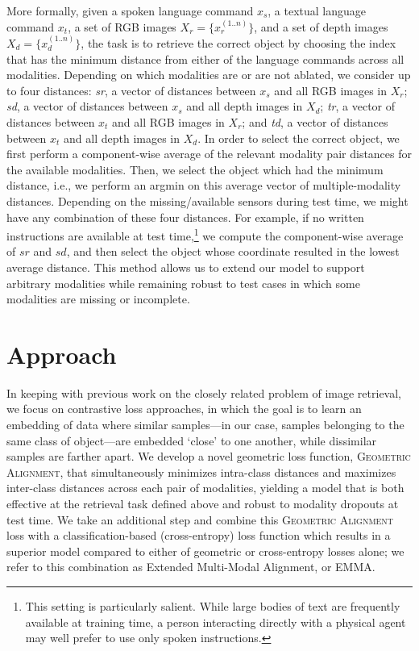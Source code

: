 \documentclass[10pt]{article} %
\newcommand{\ours}{\textsc{EMMA}}
\newcommand{\geom}{\textsc{Geometric Alignment}}
\begin{document}
More formally, given a spoken language command $x_s$, a textual language command $x_t$, a set of RGB images $X_r = \{x_r^{(1..n)}\}$, and a set of depth images $X_d = \{x_d^{(1..n)}\}$, the task is to retrieve the correct object by choosing the index that has the minimum distance from either of the language commands across all modalities.
Depending on which modalities are or are not ablated, we consider up to four distances: \textit{sr}, a vector of distances between $x_s$ and all RGB images in $X_r$; \textit{sd}, a vector of distances between $x_s$ and all depth images in $X_d$; \textit{tr}, a vector of distances between $x_t$ and all RGB images in $X_r$; and \textit{td}, a vector of distances between $x_t$ and all depth images in $X_d$. In order to select the correct object, we first perform a component-wise average of the relevant modality pair distances for the available modalities. Then, we select the object which had the minimum distance, i.e., we perform an argmin on this average vector of multiple-modality distances. Depending on the missing/available sensors during test time, we might have any combination of these four distances. For example, if no written instructions are available at test time,\footnote{This setting is particularly salient. While large bodies of text are frequently available at training time, a person interacting directly with a physical agent may well prefer to use only spoken instructions.} we compute the component-wise average of $sr$ and $sd$, and then select the object whose coordinate resulted in the lowest average distance. This method allows us to extend our model to support arbitrary modalities while remaining robust to test cases in which some modalities are missing or incomplete. 



\section{Approach}
\label{sec:Method}

In keeping with previous work on the closely related problem of image retrieval, we focus on contrastive loss approaches, in which the goal is to learn an embedding of data where similar samples---in our case, samples belonging to the same class of object---are embedded `close' to one another, while dissimilar samples are farther apart. We develop a novel geometric loss function, \geom{}, that simultaneously minimizes intra-class distances and maximizes inter-class distances across each pair of modalities, yielding a model that is both effective at the retrieval task defined above and robust to modality dropouts at test time. We take an additional step and combine this \geom{} loss with a classification-based (cross-entropy) loss function which results in a superior model compared to either of geometric or cross-entropy losses alone; we refer to this combination as Extended Multi-Modal Alignment, or \ours{}.
\end{document}
